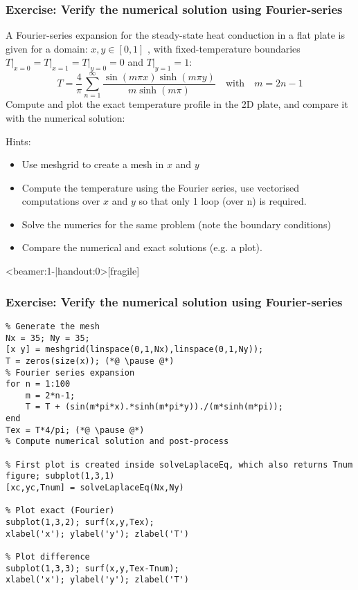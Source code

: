 
\begin{frame}[fragile]
  \frametitle{Exercise: Verify the numerical solution using Fourier-series}
  A Fourier-series expansion for the steady-state heat conduction in a flat plate is given for a domain: $x,y\in[0,1]$ , with fixed-temperature boundaries $T\big|_{x=0} = T\big|_{x=1} = T\big|_{y=0}=0$ and $T\big|_{y=1}=1$:
\[
    T = \frac{4}{\pi} \sum_{n=1}^\infty \frac{\sin\left(m \pi x \right)\sinh\left(m\pi y \right)}{m \sinh\left(m \pi \right)} \quad \text{with} \quad m=2n-1
\]
Compute and plot the exact temperature profile in the 2D plate, and compare it with the numerical solution:
  \begin{hints}
  Hints:
  \begin{itemize}
      \item Use meshgrid to create a mesh in $x$ and $y$
      \item Compute the temperature using the Fourier series, use vectorised computations over $x$ and $y$ so that only 1 loop (over n) is required.
      \item Solve the numerics for the same problem (note the boundary conditions)
      \item Compare the numerical and exact solutions (e.g. a plot).
  \end{itemize}
  \end{hints}
\end{frame}

\begin{frame}<beamer:1-|handout:0>[fragile]
  \frametitle{Exercise: Verify the numerical solution using Fourier-series}
    \begin{lstlisting}
% Generate the mesh
Nx = 35; Ny = 35;
[x y] = meshgrid(linspace(0,1,Nx),linspace(0,1,Ny));
T = zeros(size(x)); (*@ \pause @*)
% Fourier series expansion
for n = 1:100
    m = 2*n-1;
    T = T + (sin(m*pi*x).*sinh(m*pi*y))./(m*sinh(m*pi));
end
Tex = T*4/pi; (*@ \pause @*)
% Compute numerical solution and post-process

% First plot is created inside solveLaplaceEq, which also returns Tnum
figure; subplot(1,3,1)
[xc,yc,Tnum] = solveLaplaceEq(Nx,Ny) 

% Plot exact (Fourier)
subplot(1,3,2); surf(x,y,Tex);
xlabel('x'); ylabel('y'); zlabel('T')

% Plot difference
subplot(1,3,3); surf(x,y,Tex-Tnum);
xlabel('x'); ylabel('y'); zlabel('T')
    \end{lstlisting}
\end{frame}

